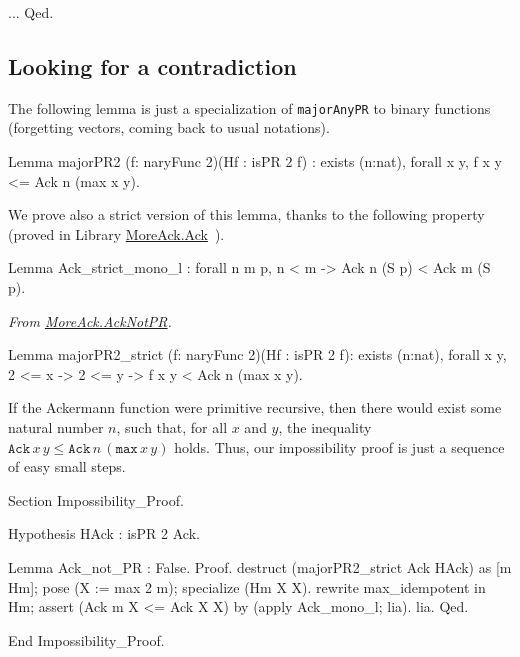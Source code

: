 \begin{Coqsrc}
 ...
Qed.
\end{Coqsrc}

\subsection{Looking for a contradiction}

The following lemma is just a specialization of \texttt{majorAnyPR} to
binary functions (forgetting vectors, coming back to usual notations).

\begin{Coqsrc}
Lemma majorPR2 (f: naryFunc 2)(Hf : isPR 2 f)
  : exists (n:nat), forall x y,  f x y <= Ack n (max x  y).
\end{Coqsrc}

We prove also a strict version of this lemma, thanks to the following property (proved in Library
\href{../theories/html/hydras.MoreAck.Ack.html}{MoreAck.Ack}~).

\begin{Coqsrc}
Lemma Ack_strict_mono_l : forall n m p, n < m ->
                                        Ack n (S p) < Ack m (S p).
\end{Coqsrc}

\vspace{4pt}
\noindent
\emph{From \href{../theories/html/hydras.MoreAck.AckNotPR.html}{MoreAck.AckNotPR}.}

\begin{Coqsrc}
Lemma majorPR2_strict (f: naryFunc 2)(Hf : isPR 2 f):
    exists (n:nat),
    forall x y, 2 <= x -> 2 <= y -> f x y < Ack n (max x  y).
\end{Coqsrc}



If the Ackermann function were primitive recursive, then there would exist some natural number $n$, such that, for all $x$ and $y$, the inequality 
$\texttt{Ack}\,x\,y\leq \texttt{Ack}\,n\,(\texttt{max}\,x\,y)$ holds.
Thus, our impossibility proof is just a sequence of easy small steps.

\begin{Coqsrc}
Section Impossibility_Proof.

  Hypothesis HAck : isPR 2 Ack.
  
  Lemma Ack_not_PR : False.
  Proof.
    destruct (majorPR2_strict Ack HAck) as [m Hm];
    pose (X := max 2 m); specialize (Hm X X).
    rewrite max_idempotent in Hm; 
    assert (Ack m X <= Ack X X) by (apply Ack_mono_l; lia).
    lia.
  Qed.

End Impossibility_Proof.
\end{Coqsrc}


